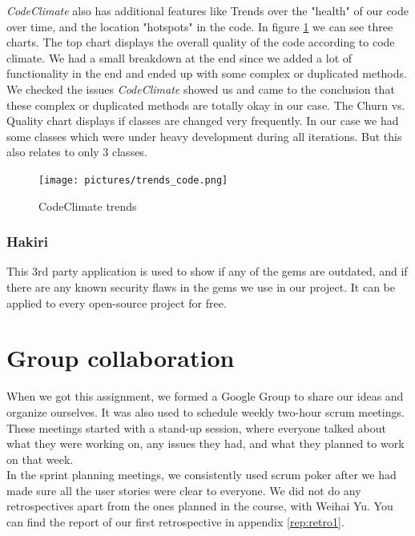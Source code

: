 \documentclass[a4paper]{article}
\begin{document}
\textit{CodeClimate} also has additional features like Trends over the "health" of our code over time, and the location "hotspots" in the code. In figure \ref{fig:codeclimate} we can see three charts. The top chart displays the overall quality of the code according to code climate. We had a small breakdown at the end since we added a lot of functionality in the end and ended up with some complex or duplicated methods. We checked the issues \textit{CodeClimate} showed us and came to the conclusion that these complex or duplicated methods are totally okay in our case. The Churn vs. Quality chart displays if classes are changed very frequently. In our case we had some classes which were under heavy development during all iterations. But this also relates to only 3 classes.

\begin{figure}[!h]
  \begin{center}
    \texttt{[image: pictures/trends\_code.png]}
    \caption{CodeClimate trends}
    \label{fig:codeclimate}
  \end{center}
\end{figure}

\subsubsection{Hakiri}
This 3rd party application is used to show if any of the gems are outdated, and if there are any known security flaws in the gems we use in our project. It can be applied to every open-source project for free.

\section{Group collaboration}
When we got this assignment, we formed a Google Group to share our ideas and organize ourselves. It was also used to schedule weekly two-hour scrum meetings. These meetings started with a stand-up session, where everyone talked about what they were working on, any issues they had, and what they planned to work on that week.\\

\noindent
In the sprint planning meetings, we consistently used scrum poker after we had made sure all the user stories were clear to everyone. We did not do any retrospectives apart from the ones planned in the course, with Weihai Yu. You can find the report of our first retrospective in appendix \ref{rep:retro1}.\\
\end{document}
